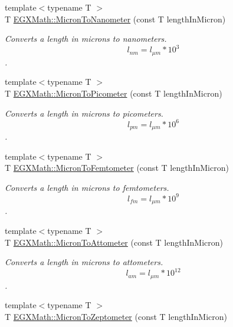 \begin{DoxyCompactItemize}
{\footnotesize template$<$typename T $>$ }\\T \mbox{\hyperlink{group___e_g_x_math-_conversions-_length_conversions-_non-_s_i-_micron-_s_i_ga6006dadf7b1a114319bf3b5768f7ef90}{E\+G\+X\+Math\+::\+Micron\+To\+Nanometer}} (const T length\+In\+Micron)
\begin{DoxyCompactList}\small\item\em Converts a length in microns to nanometers. \[ l_{nm}=l_{\mu m} * 10^{3} \]. \end{DoxyCompactList}\item 
{\footnotesize template$<$typename T $>$ }\\T \mbox{\hyperlink{group___e_g_x_math-_conversions-_length_conversions-_non-_s_i-_micron-_s_i_ga6e091e653fd9efb8769cc131fcbc41bc}{E\+G\+X\+Math\+::\+Micron\+To\+Picometer}} (const T length\+In\+Micron)
\begin{DoxyCompactList}\small\item\em Converts a length in microns to picometers. \[ l_{pm}=l_{\mu m} * 10^{6} \]. \end{DoxyCompactList}\item 
{\footnotesize template$<$typename T $>$ }\\T \mbox{\hyperlink{group___e_g_x_math-_conversions-_length_conversions-_non-_s_i-_micron-_s_i_ga5e44d2763986cc07af67fdbdbe50d8fc}{E\+G\+X\+Math\+::\+Micron\+To\+Femtometer}} (const T length\+In\+Micron)
\begin{DoxyCompactList}\small\item\em Converts a length in microns to femtometers. \[ l_{fm}=l_{\mu m} * 10^{9} \]. \end{DoxyCompactList}\item 
{\footnotesize template$<$typename T $>$ }\\T \mbox{\hyperlink{group___e_g_x_math-_conversions-_length_conversions-_non-_s_i-_micron-_s_i_ga6afa3c6c25d1bbab9a96751f3a9eb1e9}{E\+G\+X\+Math\+::\+Micron\+To\+Attometer}} (const T length\+In\+Micron)
\begin{DoxyCompactList}\small\item\em Converts a length in microns to attometers. \[ l_{am}=l_{\mu m} * 10^{12} \]. \end{DoxyCompactList}\item 
{\footnotesize template$<$typename T $>$ }\\T \mbox{\hyperlink{group___e_g_x_math-_conversions-_length_conversions-_non-_s_i-_micron-_s_i_ga4b94a208fdb102d95ba62440f921875e}{E\+G\+X\+Math\+::\+Micron\+To\+Zeptometer}} (const T length\+In\+Micron)

\end{DoxyCompactItemize}
